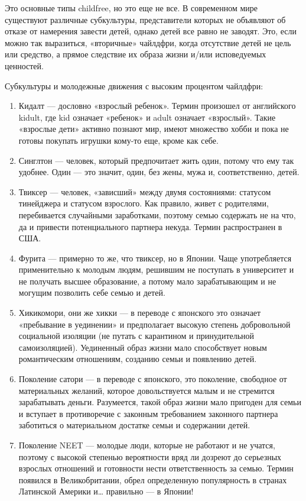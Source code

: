 Это основные типы childfree, но это еще не все. В современном мире существуют различные субкультуры, представители которых не объявляют об отказе от намерения завести детей, однако детей все равно не заводят. Это, если можно так выразиться, «вторичные» чайлдфри, когда отсутствие детей не цель или средство, а прямое следствие их образа жизни и/или исповедуемых ценностей.

Субкультуры и молодежные движения с высоким процентом чайлдфри:

\begin{enumerate}
    \item Кидалт --- дословно «взрослый ребенок». Термин произошел от английского kidult, где kid означает «ребенок» и adult означает «взрослый». Такие «взрослые дети» активно познают мир, имеют множество хобби и пока не готовы покупать игрушки кому-то еще, кроме как себе.
    \item Синглтон --- человек, который предпочитает жить один, потому что ему так удобнее. Один --- это значит, один, без жены, мужа и, соответственно, детей.
    \item Твиксер --- человек, «зависший» между двумя состояниями: статусом тинейджера и статусом взрослого. Как правило, живет с родителями, перебивается случайными заработками, поэтому семью содержать не на что, да и привести потенциального партнера некуда. Термин распространен в США.
    \item Фурита --- примерно то же, что твиксер, но в Японии. Чаще употребляется применительно к молодым людям, решившим не поступать в университет и не получать высшее образование, а потому мало зарабатывающим и не могущим позволить себе семью и детей.
    \item Хикикомори, они же хикки --- в переводе с японского это означает «пребывание в уединении» и предполагает высокую степень добровольной социальной изоляции (не путать с карантином и принудительной самоизоляцией). Уединенный образ жизни мало способствует новым романтическим отношениям, созданию семьи и появлению детей.
    \item Поколение сатори --- в переводе с японского, это поколение, свободное от материальных желаний, которое довольствуется малым и не стремится зарабатывать деньги. Разумеется, такой образ жизни мало пригоден для семьи и вступает в противоречие с законным требованием законного партнера заботиться о материальном достатке семьи и содержании детей.
    \item Поколение NEET --- молодые люди, которые не работают и не учатся, поэтому с высокой степенью вероятности вряд ли дозреют до серьезных взрослых отношений и готовности нести ответственность за семью. Термин появился в Великобритании, обрел определенную популярность в странах Латинской Америки и… правильно --- в Японии!
\end{enumerate}

